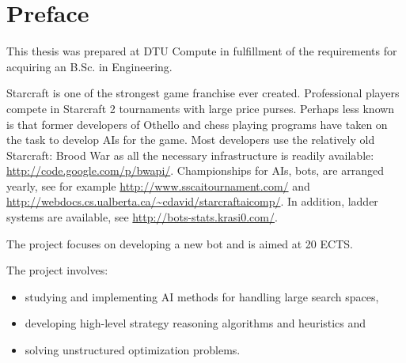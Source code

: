 \chapter{Preface}
This thesis was prepared at DTU Compute in fulfillment of the requirements for acquiring an B.Sc. in Engineering.

Starcraft is one of the strongest game franchise ever created. Professional players compete in Starcraft 2 tournaments with large price purses. Perhaps less known is that former developers of Othello and chess playing programs have taken on the task to develop AIs for the game. Most developers use the relatively old Starcraft: Brood War as all the necessary infrastructure is readily available: \url{http://code.google.com/p/bwapi/}. Championships for AIs, bots, are arranged yearly, see for example \url{http://www.sscaitournament.com/} and \url{http://webdocs.cs.ualberta.ca/~cdavid/starcraftaicomp/}. In addition, ladder systems are available, see \url{http://bots-stats.krasi0.com/}.

The project focuses on developing a new bot and is aimed at 20 ECTS.

The project involves:
\begin{itemize}
	\item studying and implementing AI methods for handling large search spaces,
	\item developing high-level strategy reasoning algorithms and heuristics and
	\item solving unstructured optimization problems.
\end{itemize}